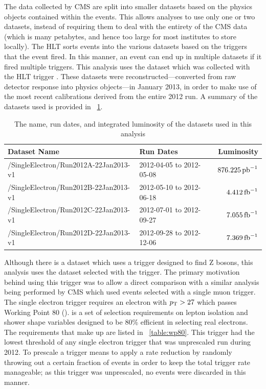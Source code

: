 The data collected by CMS are split into smaller datasets based on the physics
objects contained within the events. This allows analyses to use only one or
two datasets, instead of requiring them to deal with the entirety of the CMS
data (which is many petabytes, and hence too large for most institutes to store
locally). The HLT sorts events into the various datasets based on the triggers
that the event fired. In this manner, an event can end up in multiple datasets
if it fired multiple triggers. This analysis uses the \SingleElectron dataset
which was collected with the HLT trigger \SingleElectronTrigger. These datasets
were reconstructed---converted from raw detector response into physics
objects---in January 2013, in order to make use of the most recent
calibrations derived from the entire 2012 run. A summary of the datasets used
is provided in \TAB~\ref{table:datasets}.

\begin{table}[h]
\centering
{}
\begin{center}
    \begin{tabular}{@{}l l r@{}}
    \toprule
    Dataset Name                          & Run Dates                & Luminosity       \\
    \midrule
    /SingleElectron/Run2012A-22Jan2013-v1 & 2012-04-05 to 2012-05-08 & $876.225 \mbox{\ensuremath{\,\text{pb}^\text{$-$1}}}$ \\
    /SingleElectron/Run2012B-22Jan2013-v1 & 2012-05-10 to 2012-06-18 & $4.412 \mbox{\ensuremath{\,\text{fb}^\text{$-$1}}}$   \\
    /SingleElectron/Run2012C-22Jan2013-v1 & 2012-07-01 to 2012-09-27 & $7.055 \mbox{\ensuremath{\,\text{fb}^\text{$-$1}}}$   \\
    /SingleElectron/Run2012D-22Jan2013-v1 & 2012-09-28 to 2012-12-06 & $7.369 \mbox{\ensuremath{\,\text{fb}^\text{$-$1}}}$   \\
    \bottomrule
    \end{tabular}
\end{center}
\caption[
    Summary of datasets.
]{
    The name, run dates, and integrated luminosity of the datasets used in this
    analysis
}
\label{table:datasets}
\end{table}

Although there is a \DoubleElectron dataset which uses a trigger designed to
find Z bosons, this analysis uses the \SingleElectron dataset selected with the
\SingleElectronTrigger trigger. The primary motivation behind using this
trigger was to allow a direct comparison with a similar \phistar analysis being
performed by CMS which used \Ztomumu events selected with a single muon
trigger. The single electron trigger requires an electron with $p_{\mathrm{T}} > 27$ which
passes Working Point 80 (\WPEighty). \WPEighty is a set of selection
requirements on lepton isolation and shower shape variables designed to be 80\%
efficient in selecting real electrons. The requirements that make up \WPEighty
are listed in \TAB~\ref{table:wp80}. This trigger had the lowest \pt threshold
of any single electron trigger that was unprescaled run during 2012. To
prescale a trigger means to apply a rate reduction by randomly throwing out a
certain fraction of events in order to keep the total trigger rate manageable;
as this trigger was unprescaled, no events were discarded in this manner.

